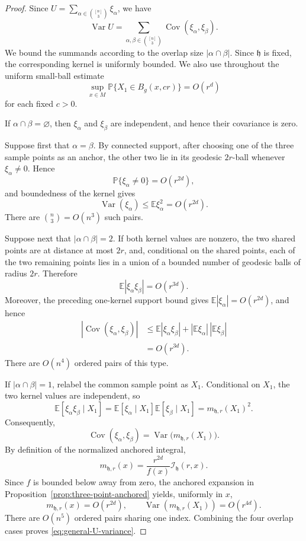 \documentclass[11pt]{article}
\theoremstyle{remark}
\newcommand{\E}{\mathbb E}
\numberwithin{equation}{section}
\begin{document}
\begin{proof}
Since
$U=\sum_{\alpha\in\binom{[n]}3}\xi_\alpha$,
we have
\[
\operatorname{Var}U
=
\sum_{\alpha,\beta\in\binom{[n]}3}
\operatorname{Cov}(\xi_\alpha,\xi_\beta).
\]
We bound the summands according to the overlap size
$|\alpha\cap\beta|$.  Since $\mathfrak h$ is fixed, the corresponding
kernel is uniformly bounded.  We also use throughout the uniform
small-ball estimate
\[
\sup_{x\in M}
\mathbb P\{X_1\in B_g(x,cr)\}
=O(r^d)
\]
for each fixed $c>0$.

If $\alpha\cap\beta=\varnothing$, then $\xi_\alpha$ and $\xi_\beta$
are independent, and hence their covariance is zero.

Suppose first that $\alpha=\beta$.  By connected support, after choosing
one of the three sample points as an anchor, the other two lie in its
geodesic $2r$-ball whenever $\xi_\alpha\ne0$.  Hence
\[
\mathbb P\{\xi_\alpha\ne0\}=O(r^{2d}),
\]
and boundedness of the kernel gives
\[
\operatorname{Var}(\xi_\alpha)
\le \E\xi_\alpha^2
=O(r^{2d}).
\]
There are $\binom n3=O(n^3)$ such pairs.

Suppose next that $|\alpha\cap\beta|=2$.  If both kernel values are
nonzero, the two shared points are at distance at most $2r$, and,
conditional on the shared points, each of the two remaining points lies
in a union of a bounded number of geodesic balls of radius $2r$.
Therefore
\[
\E|\xi_\alpha\xi_\beta|=O(r^{3d}).
\]
Moreover, the preceding one-kernel support bound gives
$\E|\xi_\alpha|=O(r^{2d})$, and hence
\[
\begin{aligned}
|\operatorname{Cov}(\xi_\alpha,\xi_\beta)|
&\le
\E|\xi_\alpha\xi_\beta|
+|\E\xi_\alpha|\,|\E\xi_\beta|\\
&=O(r^{3d}).
\end{aligned}
\]
There are $O(n^4)$ ordered pairs of this type.

If $|\alpha\cap\beta|=1$, relabel the common sample point as $X_1$.
Conditional on $X_1$, the two kernel values are independent, so
\[
\E[\xi_\alpha\xi_\beta\mid X_1]
=
\E[\xi_\alpha\mid X_1]\E[\xi_\beta\mid X_1]
=
m_{\mathfrak h,r}(X_1)^2.
\]
Consequently,
\[
\operatorname{Cov}(\xi_\alpha,\xi_\beta)
=
\operatorname{Var}\bigl(m_{\mathfrak h,r}(X_1)\bigr).
\]
By definition of the normalized anchored integral,
\[
m_{\mathfrak h,r}(x)
=
\frac{r^{2d}}{f(x)}\mathcal I_{\mathfrak h}(r,x).
\]
Since $f$ is bounded below away from zero, the anchored expansion in
Proposition~\ref{prop:three-point-anchored} yields, uniformly in $x$,
\[
m_{\mathfrak h,r}(x)=O(r^{2d}),
\qquad
\operatorname{Var}(m_{\mathfrak h,r}(X_1))=O(r^{4d}).
\]
There are $O(n^5)$ ordered pairs sharing one index.  Combining the four
overlap cases proves \eqref{eq:general-U-variance}.


\end{proof}
\end{document}
